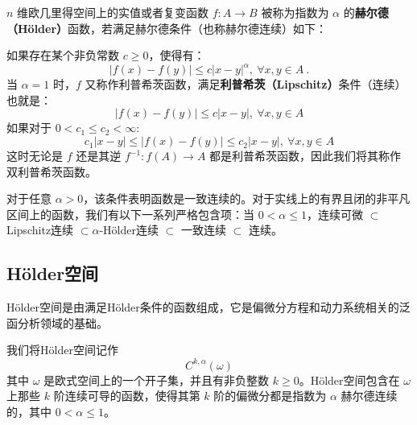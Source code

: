 \begin{issues}
\issueDraft
\end{issues}
$n$ 维欧几里得空间上的实值或者复变函数 $f:A \rightarrow B$ 被称为指数为 $\alpha$ 的\textbf{赫尔德（Hölder）}函数，若满足赫尔德条件（也称赫尔德连续）如下：

如果存在某个非负常数 $c\geq 0$，使得有：
\begin{equation}
|f(x)-f(y)|\leq c|x-y|^\alpha,\ \forall x,y \in A~.
\end{equation}
当 $\alpha=1$ 时，$f$ 又称作利普希茨函数，满足\textbf{利普希茨（Lipschitz）}条件（连续）也就是：
\begin{equation}
|f(x)-f(y)|\leq c|x-y|,\ \forall x,y \in A
\end{equation}
如果对于 $0<c_1\leq c_2<\infty $:
\begin{equation}
c_1|x-y|\leq |f(x)-f(y)|\leq  c_2|x-y|,\ \forall x,y \in A
\end{equation}
这时无论是 $f$ 还是其逆 $f^{-1}:f(A)\rightarrow A$ 都是利普希茨函数，因此我们将其称作双利普希茨函数。

对于任意 $\alpha > 0$，该条件表明函数是一致连续的。对于实线上的有界且闭的非平凡区间上的函数，我们有以下一系列严格包含项：当 $0<\alpha\leq 1$，连续可微 $\subset$Lipschitz连续 $\subset\alpha$-Hölder连续 $\subset$ 一致连续 $\subset$ 连续。
\subsection{Hölder空间}
Hölder空间是由满足Hölder条件的函数组成，它是偏微分方程和动力系统相关的泛函分析领域的基础。

我们将Hölder空间记作
\begin{equation}
C^{k,\alpha}(\omega)
\end{equation}
其中 $\omega$ 是欧式空间上的一个开子集，并且有非负整数 $k\geq 0$。Hölder空间包含在 $\omega$ 上那些 $k$ 阶连续可导的函数，使得其第 $k$ 阶的偏微分都是指数为 $\alpha$ 赫尔德连续的，其中 $0<\alpha\leq 1$。
